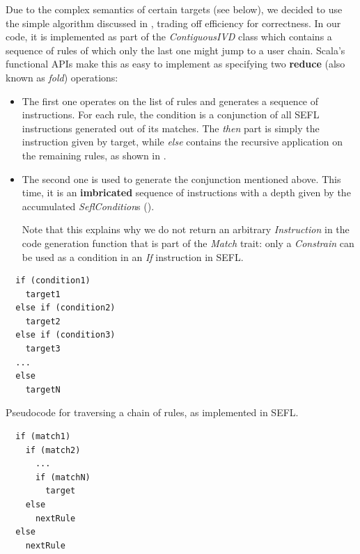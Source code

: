 {Due to the complex semantics of certain targets (see below), we decided to use
the simple algorithm discussed in ,
trading off efficiency for correctness.  In our code, it is implemented as part
of the \emph{ContiguousIVD} class which contains a sequence of rules of which
only the last one might jump to a user chain.  Scala's functional APIs make
this as easy to implement as specifying two \textbf{reduce} (also known as
\emph{fold}) operations:
\begin{itemize}
  \item The first one operates on the list of rules and generates a sequence of
     instructions.  For each rule, the condition is a
    conjunction of all SEFL instructions generated out of its matches.  The
    \emph{then} part is simply the instruction given by target, while
    \emph{else} contains the recursive application on the remaining rules, as
    shown in .

  \item The second one is used to generate the conjunction mentioned above.
    This time, it is an \textbf{imbricated} sequence of 
    instructions with a depth given by the accumulated \emph{SeflCondition}s
    ().

    Note that this explains why we do not return an arbitrary
    \emph{Instruction} in the code generation function that is part of the
    \emph{Match} trait: only a \emph{Constrain} can be used as a condition in
    an \emph{If} instruction in SEFL.
\end{itemize}

\begin{minipage}[t]{.45\textwidth}
  \begin{listing}[H]
    \lstset{numbers=none, frame=single}
    \begin{lstlisting}
  if (condition1)
    target1
  else if (condition2)
    target2
  else if (condition3)
    target3
  ...
  else
    targetN
    \end{lstlisting}

    \caption{Pseudocode for traversing a chain of rules, as implemented in
    SEFL.}
    \label{algo:if-then-else}
  \end{listing}
\end{minipage}\hfill
\begin{minipage}[t]{.45\textwidth}
  \begin{listing}[H]
    \lstset{numbers=none, frame=single}
    \begin{lstlisting}
  if (match1)
    if (match2)
      ...
      if (matchN)
        target
    else
      nextRule
  else
    nextRule
    \end{lstlisting}


\end{listing}
\end{minipage}}
